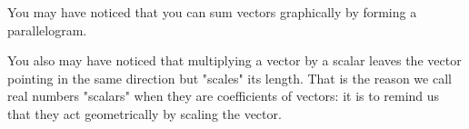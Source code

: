\documentclass{ximera}
\begin{document}
You may have noticed that you can sum vectors graphically by forming a
parallelogram.

  		You also may have noticed that multiplying a vector by a scalar leaves the vector pointing in the same direction but "scales" its length.  That is the reason we call real
  		numbers  "scalars" when they are coefficients of vectors:  it is to remind us that they act geometrically by scaling the vector.
\end{document}
